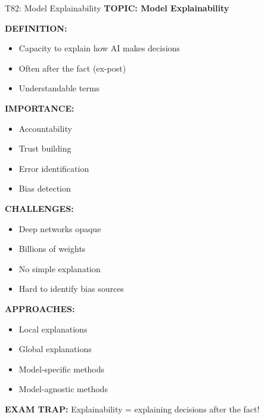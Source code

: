 \documentclass[8pt]{beamer}
\begin{document}
	\begin{frame}{T82: Model Explainability}
		\fontsize{6.5}{7.5}\selectfont
		\textbf{TOPIC: Model Explainability}
		
		\vspace{0.1cm}
		\textbf{DEFINITION:}
		\begin{itemize}
			\item Capacity to explain how AI makes decisions
			\item Often after the fact (ex-post)
			\item Understandable terms
		\end{itemize}
		
		\vspace{0.1cm}
		\textbf{IMPORTANCE:}
		\begin{itemize}
			\item Accountability
			\item Trust building
			\item Error identification
			\item Bias detection
		\end{itemize}
		
		\vspace{0.1cm}
		\textbf{CHALLENGES:}
		\begin{itemize}
			\item Deep networks opaque
			\item Billions of weights
			\item No simple explanation
			\item Hard to identify bias sources
		\end{itemize}
		
		\vspace{0.1cm}
		\textbf{APPROACHES:}
		\begin{itemize}
			\item Local explanations
			\item Global explanations
			\item Model-specific methods
			\item Model-agnostic methods
		\end{itemize}
		
		\textcolor{myred}{\textbf{EXAM TRAP:}} Explainability = \textcolor{myblue}{explaining decisions after the fact}!
	\end{frame}
	
\end{document}
